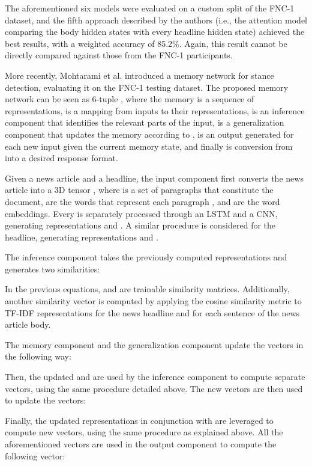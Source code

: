 The aforementioned six models were evaluated on a custom split of the FNC-1 dataset, and the fifth approach described by the authors (i.e., the attention model comparing the body hidden states with every headline hidden state) achieved the best results, with a weighted accuracy of 85.2\%. Again, this result cannot be directly compared against those from the FNC-1 participants.

More recently, Mohtarami et al. \cite{Mohtarami2018} introduced a memory network for stance detection, evaluating it on the FNC-1 testing dataset. The proposed memory network can be seen as 6-tuple , where the memory  is a sequence of representations,  is a mapping from inputs to their representations,  is an inference component that identifies the relevant parts of the input,  is a generalization component that updates the memory according to ,  is an output generated for each new input given the current memory state, and finally   is conversion from  into a desired response format.

Given a news article and a headline, the input component  first converts the news article into a 3D tensor , where  is a set of paragraphs that constitute the document,  are the words that represent each paragraph , and  are the word embeddings. Every  is separately processed through an LSTM and a CNN, generating representations  and . A similar procedure is considered for the headline, generating representations  and .

The inference component  takes the previously computed representations and generates two similarities:



In the previous equations,  and  are trainable similarity matrices. Additionally, another similarity vector  is computed by applying the cosine similarity metric to TF-IDF representations for the news headline and for each sentence of the news article body.

The memory component  and the generalization component  update the  vectors in the following way:

Then, the updated  and  are used by the inference component  to compute separate  vectors, using the same procedure detailed above. The new  vectors are then used to update the  vectors:

Finally, the updated  representations in conjunction with  are leveraged to compute new  vectors, using the same procedure as explained above. All the aforementioned vectors are used in the output component  to compute the following vector:



